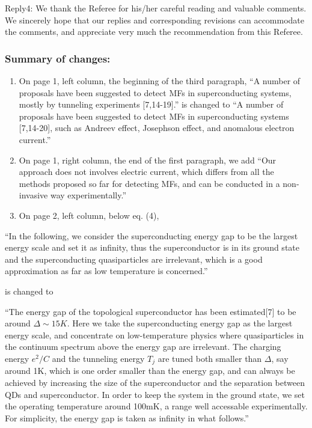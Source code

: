 \documentclass[11pt]{article}
\begin{document}
Reply4: We thank the Referee for his/her careful reading and valuable
comments. We sincerely hope that our replies and corresponding revisions
can accommodate the comments, and appreciate very much the
recommendation from this Referee.

\hypertarget{summary-of-changes}{%
\subsubsection{Summary of changes:}\label{summary-of-changes}}

\begin{enumerate}
\def\labelenumi{(\arabic{enumi})}
\item
  On page 1, left column, the beginning of the third paragraph, ``A
  number of proposals have been suggested to detect MFs in
  superconducting systems, mostly by tunneling experiments
  {[}7,14-19{]}.'' is changed to ``A number of proposals have been
  suggested to detect MFs in superconducting systems {[}7,14-20{]}, such
  as Andreev effect, Josephson effect, and anomalous electron current.''
\item
  On page 1, right column, the end of the first paragraph, we add ``Our
  approach does not involves electric current, which differs from all
  the methods proposed so far for detecting MFs, and can be conducted in
  a non-invasive way experimentally.''
\item
  On page 2, left column, below eq. (4),
\end{enumerate}

``In the following, we consider the superconducting energy gap to be the
largest energy scale and set it as infinity, thus the superconductor is
in its ground state and the superconducting quasiparticles are
irrelevant, which is a good approximation as far as low temperature is
concerned.''

is changed to

``The energy gap of the topological superconductor has been
estimated{[}7{]} to be around \(\Delta \sim 15K\). Here we take the
superconducting energy gap as the largest energy scale, and concentrate
on low-temperature physics where quasiparticles in the continuum
spectrum above the energy gap are irrelevant. The charging energy
\({e^2}/{C}\) and the tunneling energy \(T_j\) are tuned both smaller
than \(\Delta\), say around 1K, which is one order smaller than the
energy gap, and can always be achieved by increasing the size of the
superconductor and the separation between QDs and superconductor. In
order to keep the system in the ground state, we set the operating
temperature around 100mK, a range well accessable experimentally. For
simplicity, the energy gap is taken as infinity in what follows.''
\end{document}

